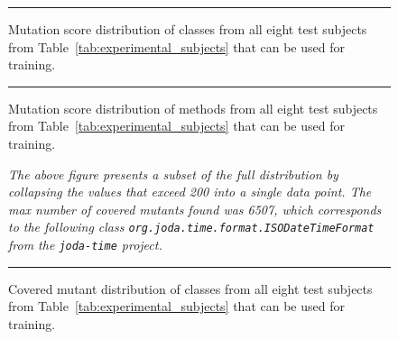 \begin{figure}[!tb]
  \centering
  \caption{Mutation score distribution of classes from all eight test subjects from Table~\ref{tab:experimental_subjects} that can be used for training.}
  \vspace{2mm}
  \hrule
  \label{fig:mutation_distributions_class_all}
\end{figure}

\begin{figure}[!tb]
  \centering
  \caption{Mutation score distribution of methods from all eight test subjects from Table~\ref{tab:experimental_subjects} that can be used for training.}
  \vspace{2mm}
  \hrule
  \label{fig:mutation_distributions_method_all}
\end{figure}

\begin{figure}[!tb]
  \centering
  \caption{Covered mutant distribution of classes from all eight test subjects from Table~\ref{tab:experimental_subjects} that can be used for training.}
  \vspace{1mm}
  \footnotesize{\emph{The above figure presents a subset of the full distribution by collapsing the values that exceed 200 into a single data point. The max number of covered mutants found was 6507, which corresponds to the following class \texttt{org.joda.time.format.ISODateTimeFormat} from the \texttt{joda-time} project.}}
  \vspace{2mm}
  \hrule
  \label{fig:covered_mutant_distributions_class_all}
\end{figure}

